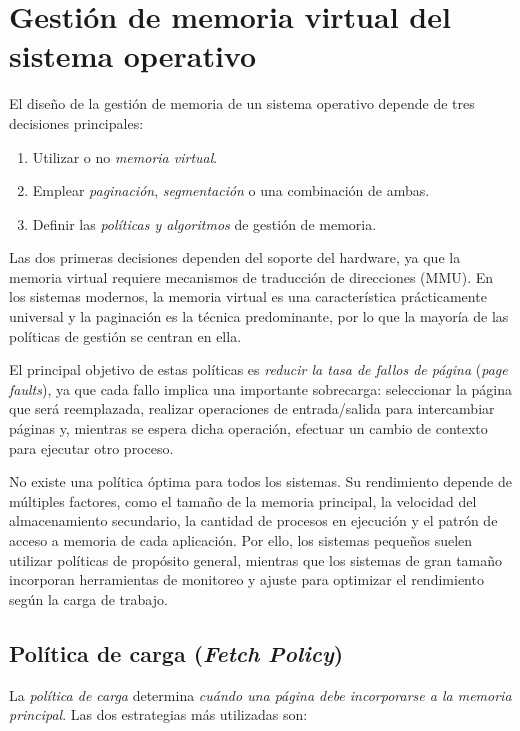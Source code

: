 \section{Gestión de memoria virtual del sistema operativo}

El diseño de la gestión de memoria de un sistema operativo depende de tres decisiones principales:

\begin{enumerate}
  \item Utilizar o no \textit{memoria virtual}.
  \item Emplear \textit{paginación}, \textit{segmentación} o una combinación de ambas.
  \item Definir las \textit{políticas y algoritmos} de gestión de memoria.
\end{enumerate}

Las dos primeras decisiones dependen del soporte del hardware, ya que la memoria virtual requiere mecanismos de traducción de direcciones (MMU). En los sistemas modernos, la memoria virtual es una característica prácticamente universal y la paginación es la técnica predominante, por lo que la mayoría de las políticas de gestión se centran en ella.

El principal objetivo de estas políticas es \textit{reducir la tasa de fallos de página} (\textit{page faults}), ya que cada fallo implica una importante sobrecarga: seleccionar la página que será reemplazada, realizar operaciones de entrada/salida para intercambiar páginas y, mientras se espera dicha operación, efectuar un cambio de contexto para ejecutar otro proceso.

No existe una política óptima para todos los sistemas. Su rendimiento depende de múltiples factores, como el tamaño de la memoria principal, la velocidad del almacenamiento secundario, la cantidad de procesos en ejecución y el patrón de acceso a memoria de cada aplicación. Por ello, los sistemas pequeños suelen utilizar políticas de propósito general, mientras que los sistemas de gran tamaño incorporan herramientas de monitoreo y ajuste para optimizar el rendimiento según la carga de trabajo.

\subsection{Política de carga (\textit{Fetch Policy})}

La \textit{política de carga} determina \textit{cuándo una página debe incorporarse a la memoria principal}. Las dos estrategias más utilizadas son:

